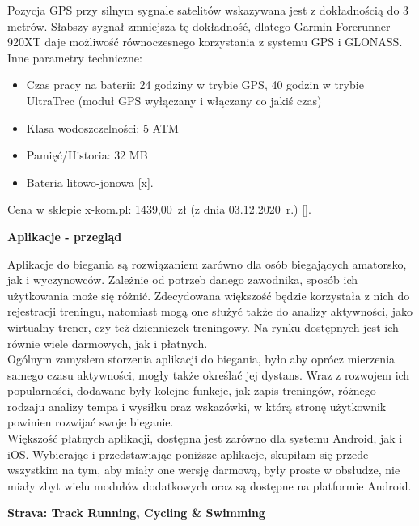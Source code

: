 \documentclass[a4paper,12pt,reqno]{article}
\begin{document}
Pozycja GPS przy silnym sygnale satelitów wskazywana jest z dokładnością do 3 metrów. Słabszy sygnał zmniejsza tę dokładność, dlatego Garmin Forerunner 920XT daje możliwość równoczesnego korzystania z systemu GPS i GLONASS.\\

Inne parametry techniczne:
\begin{itemize}
	\item Czas pracy na baterii: 24 godziny w trybie GPS, 40 godzin w trybie UltraTrec (moduł GPS wyłączany i włączany co jakiś czas)
	\item Klasa wodoszczelności: 5 ATM
	\item Pamięć/Historia: 32 MB
	\item Bateria litowo-jonowa [x].
\end{itemize}

Cena w sklepie x-kom.pl: 1439,00~zł (z dnia 03.12.2020~r.) [].
\newpage

\begin{flushleft}
	\Large \textbf{Aplikacje - przegląd}
\end{flushleft}
\vspace{1cm}

Aplikacje do biegania są rozwiązaniem zarówno dla osób biegających amatorsko, jak i wyczynowców. Zależnie od potrzeb danego zawodnika, sposób ich użytkowania może się różnić. Zdecydowana większość będzie korzystała z nich do rejestracji treningu, natomiast mogą one służyć także do analizy aktywności, jako wirtualny trener, czy też dzienniczek treningowy. Na rynku dostępnych jest ich równie wiele darmowych, jak i płatnych.\\

Ogólnym zamysłem storzenia aplikacji do biegania, było aby oprócz mierzenia samego czasu aktywności, mogły także określać jej dystans. Wraz z rozwojem ich popularności, dodawane były kolejne funkcje, jak zapis treningów, różnego rodzaju analizy tempa i wysiłku oraz wskazówki, w którą stronę użytkownik powinien rozwijać swoje bieganie.\\

Większość płatnych aplikacji, dostępna jest zarówno dla systemu Android, jak i iOS. Wybierając i przedstawiając poniższe aplikacje, skupiłam się przede wszystkim na tym, aby miały one wersję darmową, były proste w obsłudze, nie miały zbyt wielu modułów dodatkowych oraz są dostępne na platformie Android.
\vspace{1cm}
\begin{flushleft}
	\textbf{Strava: Track Running, Cycling \& Swimming}
\end{flushleft}
\end{document}
